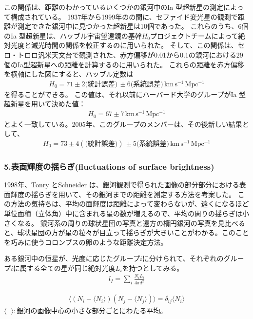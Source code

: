 \documentclass[12pt,a4paper]{article}
\theoremstyle{plain}
\theoremstyle{break}
\begin{document}
この関係は、距離のわかっているいくつかの銀河中のIa 型超新星の測定によって構成されている。
1937年から1999年のの間に、セファイド変光星の観測で距離が測定できた銀河中に見つかった超新星は10個であった。
これらのうち、6個のIa 型超新星は、ハッブル宇宙望遠鏡の基幹$H_0$プロジェクトチームによって絶対光度と減光時間の関係を較正するのに用いられた。
そして、この関係は、セロ・トロロ汎米天文台で観測された、赤方偏移が0.01から0.1の銀河における29個のIa型超新星への距離を計算するのに用いられた。
これらの距離を赤方偏移を横軸にした図にすると、ハッブル定数は
\begin{align}
  H_0 = 71 \pm 2 \text{(統計誤差)} \, \pm 6 \text{(系統誤差)} \, \mathrm{km\,s^{-1}\,Mpc^{-1}}
\end{align}
を得ることができる。
この値は、それ以前にハーバード大学のグループがIa 型超新星を用いて決めた値：
\begin{align}
  H_0 = 67 \pm 7 \, \mathrm{km\,s^{-1}\,Mpc^{-1}}
\end{align}
とよく一致している。2005年、このグループのメンバーは、その後新しい結果として、
\begin{align}
  H_0 = 73 \pm 4(\text{(統計誤差)}) \,\pm 5 \text{(系統誤差)} \, \mathrm{km \, s^{-1} \, Mpc^{-1}}
\end{align}

\subsubsection*{5.表面輝度の揺らぎ(fluctuations of surface brightness)}
1998年、Tonry とSchneider は、銀河観測で得られた画像の部分部分における表面輝度の揺らぎを用いて、その銀河までの距離を測定する方法を考案した。
この方法の気持ちは、平均の面輝度は距離によって変わらないが、遠くになるほど単位面積（立体角）中に含まれる星の数が増えるので、平均の周りの揺らぎは小さくなる。
銀河系の周りの球状星団の写真と遠方の楕円銀河の写真を見比べると、球状星団の方が星の粒々が目立って揺らぎが大きいことがわかる。このことを巧みに使うコロンブスの卵のような距離決定方法。

ある銀河中の恒星が、光度に応じたグループ$i$に分けられて、それぞれのグループ$i$に属する全ての星が同じ絶対光度$L_i$を持つとしてみる。
\begin{align}
  l_{I} = \sum_i \frac{N_i L_i}{4\pi d^2}
\end{align}

\begin{align}
  \langle (N_i - \langle N_i \rangle)(N_j - \langle N_j \rangle)\rangle = \delta_{ij} \langle N_i \rangle
\end{align}
$\langle \,\,\,\, \rangle:$銀河の画像中心の小さな部分ごとにわたる平均。
\end{document}

